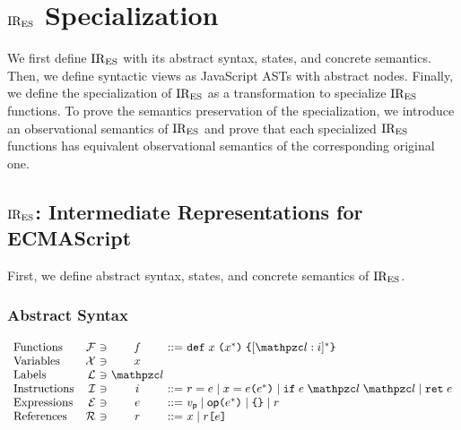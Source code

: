 \section{$\text{IR}_\text{ES}$ Specialization}\label{sec:formal}

We first define $\text{IR}_\text{ES}$ with its abstract syntax, states, and concrete
semantics.  Then, we define syntactic views as JavaScript ASTs with abstract
nodes. Finally, we define the specialization of $\text{IR}_\text{ES}$ as a transformation to
specialize $\text{IR}_\text{ES}$ functions.  To prove the semantics preservation of the
specialization, we introduce an observational semantics of $\text{IR}_\text{ES}$ and prove
that each specialized $\text{IR}_\text{ES}$ functions has equivalent observational semantics
of the corresponding original one.

\subsection{$\text{IR}_\text{ES}$: Intermediate Representations for ECMAScript}

First, we define abstract syntax, states, and concrete semantics of $\text{IR}_\text{ES}$.

\subsubsection{Abstract Syntax}

\[
  \begin{array}{lr@{~}c@{~}c@{~}c@{~}l}
    \text{Functions} & \funcset &\ni& \func &::=&
    \kwdef \; x \; \kwrl x^* \kwrr \; \kwcl [\lab: \inst]^* \kwcr\\

    \text{Variables} & \varset &\ni& x\\

    \text{Labels} & \labset &\ni& \lab\\

    \text{Instructions} & \instset &\ni& \inst &::=&
    \refer = \expr \mid
    x = \expr \kwrl \expr^* \kwrr \mid
    \kwif \; \expr \; \lab \; \lab \mid
    \kwret \; \expr\\

    \text{Expressions} & \exprset &\ni& \expr &::=&
    \pval \mid
    \op \kwrl \expr^* \kwrr \mid
    \kwcl \kwcr \mid
    \refer\\

    \text{References} & \referset &\ni& \refer &::=&
    x \mid \refer \kwsl \expr \kwsr\\
  \end{array}
\]

